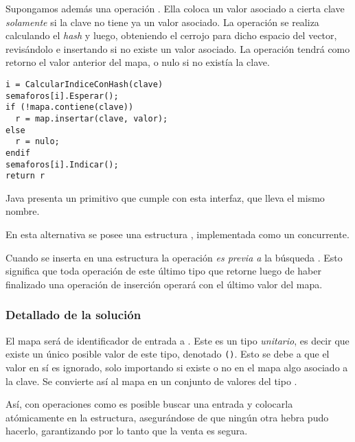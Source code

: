Supongamos además una operación .
Ella coloca un valor asociado a cierta clave \emph{solamente} si la clave no tiene ya un valor asociado.
La operación se realiza calculando el \emph{hash} y luego,
obteniendo el cerrojo para dicho espacio del vector,
revisándolo e insertando si no existe un valor asociado.
La operación tendrá como retorno el valor anterior del mapa, o nulo si no existía la clave.

\begin{verbatim}
i = CalcularIndiceConHash(clave)
semaforos[i].Esperar();
if (!mapa.contiene(clave))
  r = map.insertar(clave, valor);
else
  r = nulo;
endif
semaforos[i].Indicar();
return r
\end{verbatim}

Java presenta un primitivo que cumple con esta interfaz, que lleva el mismo nombre.

En esta alternativa se posee una estructura , implementada
como un  concurrente.

Cuando se inserta en una estructura  la
operación \emph{es previa a} la búsqueda \cite{javaspec}.
Esto significa que toda operación de este último tipo que retorne luego de
haber finalizado una operación de inserción operará con el último valor del mapa.

\subsubsection{Detallado de la solución}\label{detallado-chm}

\begin{figure}
\end{figure}

El mapa  será de identificador de entrada a .
Este es un tipo \emph{unitario}, es decir que existe un único posible valor de este tipo, denotado \texttt{()}.
Esto se debe a que el valor en sí es ignorado, solo importando si existe o no en el mapa algo asociado a la clave.
Se convierte así al mapa en un conjunto de valores del tipo .

Así, con operaciones como  es posible buscar una entrada y
colocarla atómicamente\cite{javaspec} en la estructura, asegurándose de que
ningún otra hebra pudo hacerlo, garantizando por lo tanto que la venta es segura.


